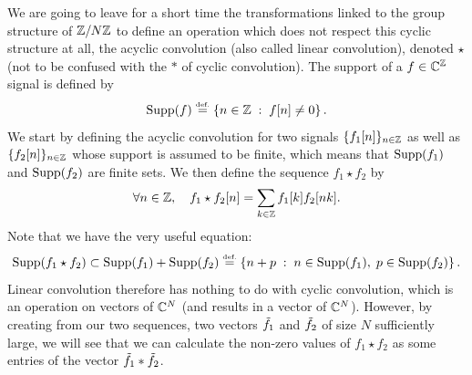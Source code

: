  
 We are going to leave for a short time the transformations linked to the group structure of $ \mathbb{Z}/N \mathbb{Z} $ to define an operation which does not respect this cyclic structure at all, the acyclic convolution (also called linear convolution), denoted $ \star $ (not to be confused with the $ * $ of cyclic convolution). The support of a $ f \in \mathbb{C}^{\mathbb{Z}} $ signal is defined by
\begin{equation*}
\operatorname{Supp} (f) \stackrel{\mbox{\upshape\tiny def.}}{=} \left\{ n \in \mathbb{Z} \;:\; f[n] \neq 0 \right\}.
\end{equation*}
We start by defining the acyclic convolution for two signals $ \{f_1 [n]\}_{n \in \mathbb{Z}} $ as well as $ \{f_2 [n]\}_{n \in \mathbb{Z}} $ whose support is assumed to be finite, which means that $ \operatorname{Supp} (f_1) $ and $ \operatorname{Supp} (f_2) $ are finite sets. We then define the sequence $ f_1 \star f_2 $ by
\begin{equation}
\label{eq-convolution-acyclic}
\forall n \in \mathbb{Z}, \quad f_1 \star f_2 [n] = \sum_{k \in \mathbb{Z}}{f_1 [k] f_2 [nk]}.
\end{equation}
Note that we have the very useful equation:
\begin{equation*}
\operatorname{Supp} (f_1 \star f_2) \subset \operatorname{Supp} (f_1) + \operatorname{Supp} (f_2) \stackrel{\mbox{\upshape\tiny def.}}{=} \left\{ n + p \;:\; n \in \operatorname{Supp} (f_1), \; p \in \operatorname{Supp} (f_2) \right\}.
\end{equation*}
Linear convolution therefore has nothing to do with cyclic convolution, which is an operation on vectors of $ \mathbb{C}^N $ (and results in a vector of $ \mathbb{C}^N $). However, by creating from our two sequences, two vectors $ \tilde{f_1} $ and $ \tilde{f_2} $ of size $N$ sufficiently large, we will see that we can calculate the non-zero values of $ f_1 \star f_2 $ as some entries of the vector $ \tilde{f_1} * \tilde{f_2} $.
 
